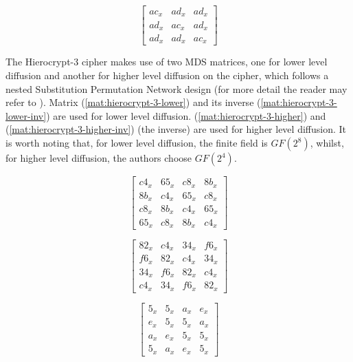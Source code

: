 \begin{equation}\label{mat:bksq-inv}
\begin{bmatrix}
ac_x & ad_x & ad_x\\
ad_x & ac_x & ad_x\\
ad_x & ad_x & ac_x
\end{bmatrix}
\end{equation}

The Hierocrypt-3 cipher makes use of two MDS matrices, one for lower level diffusion and another for higher level diffusion on the cipher, which follows a nested Substitution Permutation Network design (for more detail the reader may refer to \cite{Hierocrypt2000}). Matrix (\ref{mat:hierocrypt-3-lower}) and its inverse (\ref{mat:hierocrypt-3-lower-inv}) are used for lower level diffusion. (\ref{mat:hierocrypt-3-higher}) and (\ref{mat:hierocrypt-3-higher-inv}) (the inverse) are used for higher level diffusion. It is worth noting that, for lower level diffusion, the finite field is $GF(2^8)$, whilst, for higher level diffusion, the authors choose $GF(2^4)$.

\begin{equation}\label{mat:hierocrypt-3-lower}
\begin{bmatrix}
c4_x & 65_x & c8_x & 8b_x\\
8b_x & c4_x & 65_x & c8_x\\
c8_x & 8b_x & c4_x & 65_x\\
65_x & c8_x & 8b_x & c4_x
\end{bmatrix}
\end{equation}

\begin{equation}\label{mat:hierocrypt-3-lower-inv}
\begin{bmatrix}
82_x & c4_x & 34_x & f6_x\\
f6_x & 82_x & c4_x & 34_x\\
34_x & f6_x & 82_x & c4_x\\
c4_x & 34_x & f6_x & 82_x
\end{bmatrix}
\end{equation}

\begin{equation}\label{mat:hierocrypt-3-higher}
\begin{bmatrix}
5_x & 5_x & a_x & e_x\\
e_x & 5_x & 5_x & a_x\\
a_x & e_x & 5_x & 5_x\\
5_x & a_x & e_x & 5_x
\end{bmatrix}
\end{equation}

